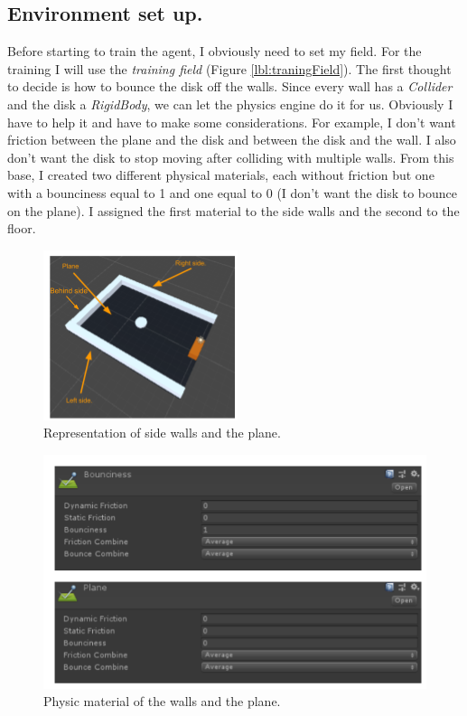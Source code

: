\documentclass[12pt]{article}
\begin{document}
	\subsection{Environment set up.}
	Before starting to train the agent, I obviously need to set my field. For the training I will use the \textit{training field} (Figure \ref{lbl:traningField}). The first thought to decide is how to bounce the disk off the walls. Since every wall has a \textit{Collider} and the disk a \textit{RigidBody}, we can let the physics engine do it for us. Obviously I have to help it and have to make some considerations. For example, I don't want friction between the plane and the disk and between the disk and the wall.
	I also don't want the disk to stop moving after colliding with multiple walls.
	From this base, I created two different physical materials, each without friction but one with a bounciness equal to 1 and one equal to 0 (I don't want the disk to bounce on the plane). I assigned the first material to the side walls and the second to the floor.
	
	\begin{figure}[hbt!]
		\centering
		\includegraphics[width= 0.73
		\textwidth]{images/SidePlane.png}
		\caption{Representation of side walls and the plane.}
		\label{lbl:SidePlane}
	\end{figure} 
	
	\newpage
	
	\begin{figure}[hbt!]
		\centering
		\includegraphics[width= 1
		\textwidth]{images/PM.png}
		\caption{Physic material of the walls and the plane.}
	\end{figure} 
\end{document}
